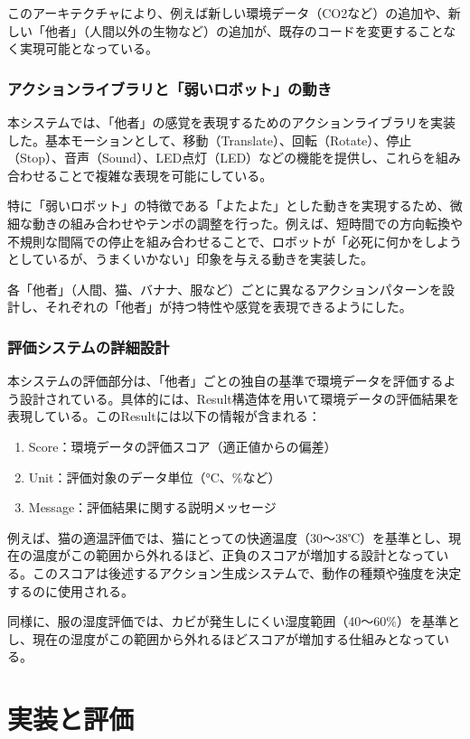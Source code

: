 \documentclass{cuxarticle}
\begin{document}
このアーキテクチャにより、例えば新しい環境データ（CO2など）の追加や、新しい「他者」（人間以外の生物など）の追加が、既存のコードを変更することなく実現可能となっている。

\subsection{アクションライブラリと「弱いロボット」の動き}
本システムでは、「他者」の感覚を表現するためのアクションライブラリを実装した。基本モーションとして、移動（Translate）、回転（Rotate）、停止（Stop）、音声（Sound）、LED点灯（LED）などの機能を提供し、これらを組み合わせることで複雑な表現を可能にしている。

特に「弱いロボット」の特徴である「よたよた」とした動きを実現するため、微細な動きの組み合わせやテンポの調整を行った。例えば、短時間での方向転換や不規則な間隔での停止を組み合わせることで、ロボットが「必死に何かをしようとしているが、うまくいかない」印象を与える動きを実装した。

各「他者」（人間、猫、バナナ、服など）ごとに異なるアクションパターンを設計し、それぞれの「他者」が持つ特性や感覚を表現できるようにした。

\subsection{評価システムの詳細設計}
本システムの評価部分は、「他者」ごとの独自の基準で環境データを評価するよう設計されている。具体的には、Result構造体を用いて環境データの評価結果を表現している。このResultには以下の情報が含まれる：

\begin{enumerate}
  \item Score：環境データの評価スコア（適正値からの偏差）
  \item Unit：評価対象のデータ単位（°C、\%など）
  \item Message：評価結果に関する説明メッセージ
\end{enumerate}

例えば、猫の適温評価では、猫にとっての快適温度（30～38℃）を基準とし、現在の温度がこの範囲から外れるほど、正負のスコアが増加する設計となっている。このスコアは後述するアクション生成システムで、動作の種類や強度を決定するのに使用される。

同様に、服の湿度評価では、カビが発生しにくい湿度範囲（40～60\%）を基準とし、現在の湿度がこの範囲から外れるほどスコアが増加する仕組みとなっている。

\chapter{実装と評価}
\end{document}
